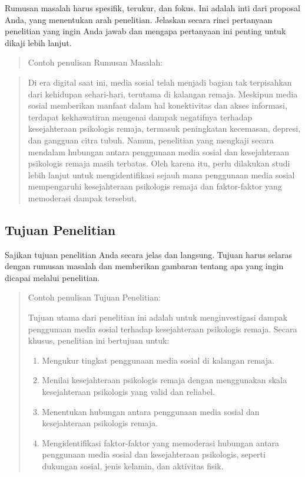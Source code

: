 \documentclass[
  indonesian,
  letterpaper,
]{scrbook}
\providecommand{\tightlist}{%
  \setlength{\itemsep}{0pt}\setlength{\parskip}{0pt}}
\begin{document}
Rumusan masalah harus spesifik, terukur, dan fokus. Ini adalah inti dari
proposal Anda, yang menentukan arah penelitian. Jelaskan secara rinci
pertanyaan penelitian yang ingin Anda jawab dan mengapa pertanyaan ini
penting untuk dikaji lebih lanjut.

\begin{quote}
Contoh penulisan Rumusan Masalah:
\end{quote}

\begin{quote}
Di era digital saat ini, media sosial telah menjadi bagian tak
terpisahkan dari kehidupan sehari-hari, terutama di kalangan remaja.
Meskipun media sosial memberikan manfaat dalam hal konektivitas dan
akses informasi, terdapat kekhawatiran mengenai dampak negatifnya
terhadap kesejahteraan psikologis remaja, termasuk peningkatan
kecemasan, depresi, dan gangguan citra tubuh. Namun, penelitian yang
mengkaji secara mendalam hubungan antara penggunaan media sosial dan
kesejahteraan psikologis remaja masih terbatas. Oleh karena itu, perlu
dilakukan studi lebih lanjut untuk mengidentifikasi sejauh mana
penggunaan media sosial mempengaruhi kesejahteraan psikologis remaja dan
faktor-faktor yang memoderasi dampak tersebut.
\end{quote}

\subsection{Tujuan Penelitian}\label{tujuan-penelitian}

Sajikan tujuan penelitian Anda secara jelas dan langsung. Tujuan harus
selaras dengan rumusan masalah dan memberikan gambaran tentang apa yang
ingin dicapai melalui penelitian.

\begin{quote}
Contoh penulisan Tujuan Penelitian:

Tujuan utama dari penelitian ini adalah untuk menginvestigasi dampak
penggunaan media sosial terhadap kesejahteraan psikologis remaja. Secara
khusus, penelitian ini bertujuan untuk:

\begin{enumerate}
\def\labelenumi{\arabic{enumi}.}
\tightlist
\item
  Mengukur tingkat penggunaan media sosial di kalangan remaja.
\item
  Menilai kesejahteraan psikologis remaja dengan menggunakan skala
  kesejahteraan psikologis yang valid dan reliabel.
\item
  Menentukan hubungan antara penggunaan media sosial dan kesejahteraan
  psikologis remaja.
\item
  Mengidentifikasi faktor-faktor yang memoderasi hubungan antara
  penggunaan media sosial dan kesejahteraan psikologis, seperti dukungan
  sosial, jenis kelamin, dan aktivitas fisik.
\end{enumerate}
\end{quote}
\end{document}
